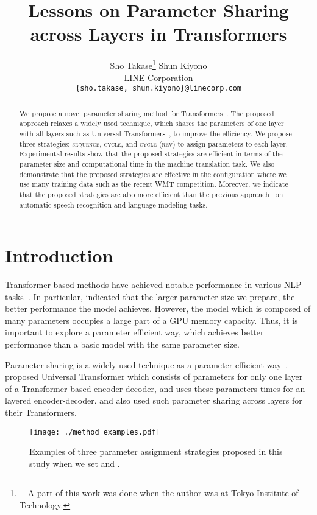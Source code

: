 \documentclass[11pt]{article}
\title{Lessons on Parameter Sharing across Layers in Transformers}
\author{Sho Takase\thanks{\ \ A part of this work was done when the author was at Tokyo Institute of Technology.} \hspace{5mm}
  Shun Kiyono \\
  LINE Corporation \\
  \texttt{\{sho.takase, shun.kiyono\}@linecorp.com} \\
  }
\begin{document}
\maketitle
\begin{abstract}
We propose a novel parameter sharing method for Transformers~\cite{NIPS2017_7181}.
The proposed approach relaxes a widely used technique, which shares the parameters of one layer with all layers such as Universal Transformers~\cite{dehghani2019}, to improve the efficiency.
We propose three strategies: \textsc{sequence}, \textsc{cycle}, and \textsc{cycle (rev)} to assign parameters to each layer.
Experimental results show that the proposed strategies are efficient in terms of the parameter size and computational time in the machine translation task.
We also demonstrate that the proposed strategies are effective in the configuration where we use many training data such as the recent WMT competition.
Moreover, we indicate that the proposed strategies are also more efficient than the previous approach~\cite{dehghani2019} on automatic speech recognition and language modeling tasks.
\end{abstract}


\section{Introduction}
\label{sec:intro}
Transformer-based methods have achieved notable performance in various NLP tasks~\cite{NIPS2017_7181,devlin-etal-2019-bert,NEURIPS2020_1457c0d6}.
In particular, \citet{NEURIPS2020_1457c0d6} indicated that the larger parameter size we prepare, the better performance the model achieves.
However, the model which is composed of many parameters occupies a large part of a GPU memory capacity.
Thus, it is important to explore a parameter efficient way, which achieves better performance than a basic model with the same parameter size.


Parameter sharing is a widely used technique as a parameter efficient way~\cite{dehghani2019,Dabre_Fujita_2019,lan2020}.
\citet{dehghani2019} proposed Universal Transformer which consists of parameters for only one layer of a Transformer-based encoder-decoder, and uses these parameters  times for an -layered encoder-decoder.
\citet{Dabre_Fujita_2019} and \citet{lan2020} also used such parameter sharing across layers for their Transformers.

\begin{figure}[!t]
  \centering 
  \texttt{[image: ./method\_examples.pdf]}
   \caption{Examples of three parameter assignment strategies proposed in this study when we set  and .}
   \label{fig:overview}
\end{figure}
\end{document}
